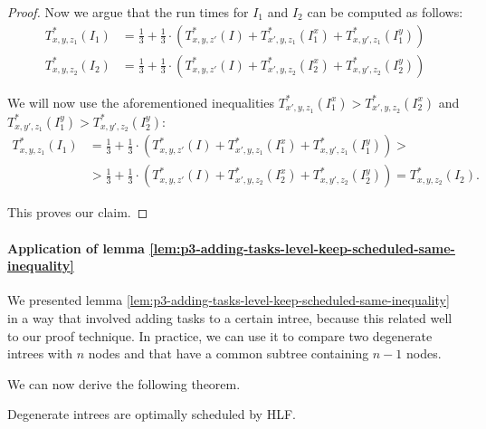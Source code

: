 \begin{proof}
  Now we argue that the run times for $I_1$ and $I_2$ can be computed as follows:
  \begin{align*}
    T^*_{x,y,z_1}(I_1) & = 
      \frac{1}{3} + 
      \frac{1}{3}\cdot \left( 
        T_{x,y,z'}^*(I) + 
        T^*_{x',y,z_1}(I^x_{1}) +
        T^*_{x,y',z_1}(I^y_{1}) 
      \right)
      \\
    T^*_{x,y,z_2}(I_2) & = 
      \frac{1}{3} + 
      \frac{1}{3}\cdot \left( 
        T_{x,y,z'}^*(I) + 
        T^*_{x',y,z_2}(I^x_{2}) +
        T^*_{x,y',z_2}(I^y_{2}) 
      \right)
  \end{align*}

  We will now use the aforementioned inequalities $T^*_{x',y,z_1}(I^x_{1}) > T^*_{x',y,z_2}(I^x_{2})$ and $T^*_{x,y',z_1}(I^y_{1}) > T^*_{x,y',z_2}(I^y_{2})$:
\begin{align*}
    T^*_{x,y,z_1}(I_1) & = 
      \frac{1}{3} + 
      \frac{1}{3}\cdot \left( 
        T_{x,y,z'}^*(I) + 
        T^*_{x',y,z_1}(I^x_{1}) +
        T^*_{x,y',z_1}(I^y_{1}) 
      \right)
      > 
      \\
      & >
      \frac{1}{3} + 
      \frac{1}{3}\cdot \left( 
        T_{x,y,z'}^*(I) + 
        T^*_{x',y,z_2}(I^x_{2}) +
        T^*_{x,y',z_2}(I^y_{2}) 
      \right) 
      = T^*_{x,y,z_2}(I_2).
  \end{align*}

  This proves our claim.    
\end{proof}

\paragraph{Application of lemma \ref{lem:p3-adding-tasks-level-keep-scheduled-same-inequality}}

We presented lemma \ref{lem:p3-adding-tasks-level-keep-scheduled-same-inequality} in a way that involved adding tasks to a certain intree, because this related well to our proof technique. In practice, we can use it to compare two degenerate intrees with $n$ nodes and that have a common subtree containing $n-1$ nodes.

We can now derive the following theorem.

\begin{theorem}
  Degenerate intrees are optimally scheduled by HLF.
\end{theorem}

